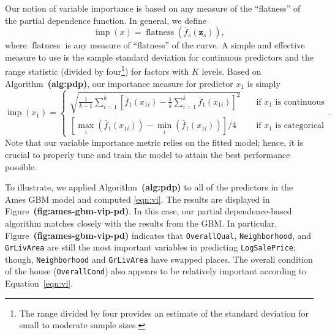 \documentclass[12pt]{article}
\def\code#1{\texttt{#1}}
\def\ref#1{\textbf{(#1)}}
\DeclareMathOperator{\flatness}{flatness}
\DeclareMathOperator{\imp}{imp}
\begin{document}
Our notion of variable importance is based on any measure of the ``flatness'' of the partial dependence function. In general, we define
\begin{equation*}
  \imp\left(x\right) = \flatness\left(\bar{f}_s\left(\boldsymbol{z}_s\right)\right),
\end{equation*}
where $\flatness$ is any measure of ``flatness'' of the curve. A simple and effective measure to use is the sample standard deviation for continuous predictors and the range statistic (divided by four\footnote{The range divided by four provides an estimate of the standard deviation for small to moderate sample sizes.}) for factors with $K$ levels. Based on Algorithm~\ref{alg:pdp}, our importance measure for predictor $x_1$ is simply
\begin{equation}
\label{eqn:vi}
  \imp\left(x_1\right) = 
  \begin{cases}
    \sqrt{\frac{1}{k - 1}\sum_{i = 1}^k\left[\bar{f}_1\left(x_{1i}\right) - \frac{1}{k}\sum_{i = 1}^k\bar{f}_1\left(x_{1i}\right)\right] ^ 2} & \quad \text{if } x_1 \text{ is continuous}\\
    \left[\max_i\left(\bar{f}_1\left(x_{1i}\right)\right) - \min_i\left(\bar{f}_1\left(x_{1i}\right)\right)\right] / 4 & \quad \text{if } x_1 \text{ is categorical}
  \end{cases}.
\end{equation}
Note that our variable importance metric relies on the fitted model; hence, it is crucial to properly tune and train the model to attain the best performance possible.

To illustrate, we applied Algorithm~\ref{alg:pdp} to all of the predictors in the Ames GBM model and computed \eqref{eqn:vi}. The results are displayed in Figure~\ref{fig:ames-gbm-vip-pd}. In this case, our partial dependence-based algorithm matches closely with the results from the GBM. In particular, Figure~\ref{fig:ames-gbm-vip-pd} indicates that \code{OverallQual}, \code{Neighborhood}, and \code{GrLivArea} are still the most important variables in predicting \code{LogSalePrice}; though, \code{Neighborhood} and \code{GrLivArea} have swapped places. The overall condition of the house (\code{OverallCond}) also appears to be relatively important according to Equation~\eqref{eqn:vi}.
\end{document}
